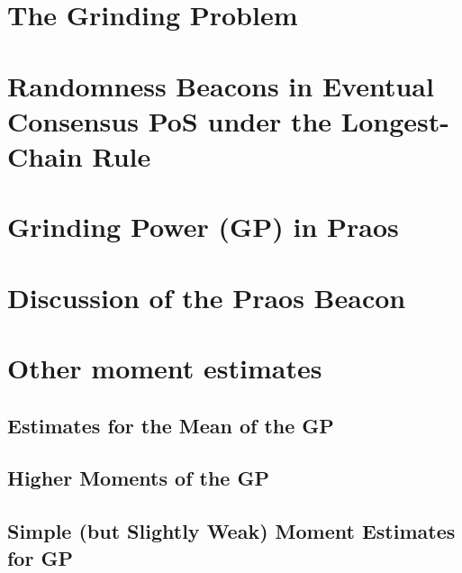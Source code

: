 


\chapter{The Grinding Problem}\label{sec:grinding-intro}


\chapter{Randomness Beacons in Eventual Consensus PoS under the Longest-Chain Rule}\label{sec:model-grinding}


% 

\chapter{Grinding Power (GP) in Praos}\label{sec:praos}


% 


\chapter{Discussion of the Praos Beacon}\label{sec:discussion-praos}



\chapter{Other moment estimates}\label{sec:praos-other-moments}

\section{Estimates for the Mean of the GP}\label{sec:praos-mean}



\section{Higher Moments of the GP}\label{sec:praos-higher-moments}



\section{Simple (but Slightly Weak) Moment Estimates for GP}\label{sec:praos-simple-moments}



